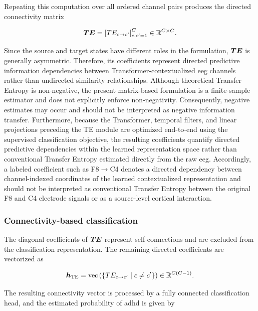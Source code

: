 Repeating this computation over all ordered channel pairs produces the directed connectivity matrix

\begin{equation}
    {\bm{TE}}
    =
    \left[
        TE_{c\rightarrow c'}
    \right]_{c,c'=1}^{C}
    \in\mathbb{R}^{C\times C}.
\end{equation}

Since the source and target states have different roles in the formulation, ${\bm{TE}}$ is generally asymmetric. Therefore, its coefficients represent directed predictive information dependencies
between Transformer-contextualized \gls{eeg} channels rather than undirected similarity relationships. {Although theoretical Transfer Entropy is non-negative, the present matrix-based formulation is a finite-sample estimator and does not explicitly enforce non-negativity. Consequently, negative estimates may occur and should not be interpreted as negative information transfer. Furthermore, because the Transformer, temporal filters, and linear projections preceding the TE module are optimized end-to-end using the supervised classification objective, the resulting coefficients quantify directed predictive dependencies within the learned representation space rather than conventional Transfer Entropy estimated directly from the raw \gls{eeg}. Accordingly, a labeled coefficient such as F8$\rightarrow$C4 denotes a directed dependency between channel-indexed coordinates of the learned contextualized representation and should not be interpreted as conventional Transfer Entropy between the original F8 and C4 electrode signals or as a source-level cortical interaction.}


\subsubsection{Connectivity-based classification}

The diagonal coefficients of ${\bm{TE}}$ represent self-connections and are excluded from the classification representation. The remaining directed coefficients are vectorized as

\begin{equation}
    {\bm{h}}_{\mathrm{TE}}
    =
    \operatorname{vec}
    \left(
        \left\{
            TE_{c\rightarrow c'}
            \mid
            c\neq c'
        \right\}
    \right)
    \in\mathbb{R}^{C(C-1)}.
\end{equation}

The resulting connectivity vector is processed by a fully connected classification head, and the estimated probability of \gls{adhd} is given by

